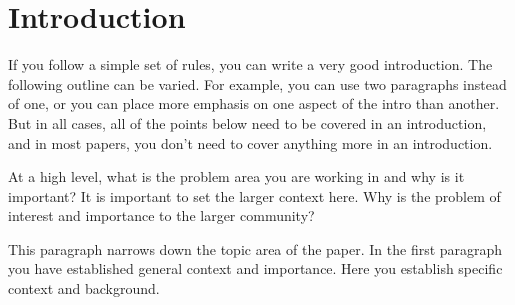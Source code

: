 \section{Introduction}\label{sec-intro}








If you follow a simple set of rules, 
you can write a very good introduction. 
The following outline can be varied. 
For example, 
you can use two paragraphs instead of one, 
or you can place more emphasis on one aspect of the intro than another. 
But in all cases, 
all of the points below need to be covered in an introduction, 
and in most papers, 
you don't need to cover anything more in an introduction.



{}
At a high level, 
what is the problem area you are working in and why is it important? 
It is important to set the larger context here. 
Why is the problem of interest and importance to the larger community?


{}
This paragraph narrows down the topic area of the paper. 
In the first paragraph you have established general context and importance. 
Here you establish specific context and background.

